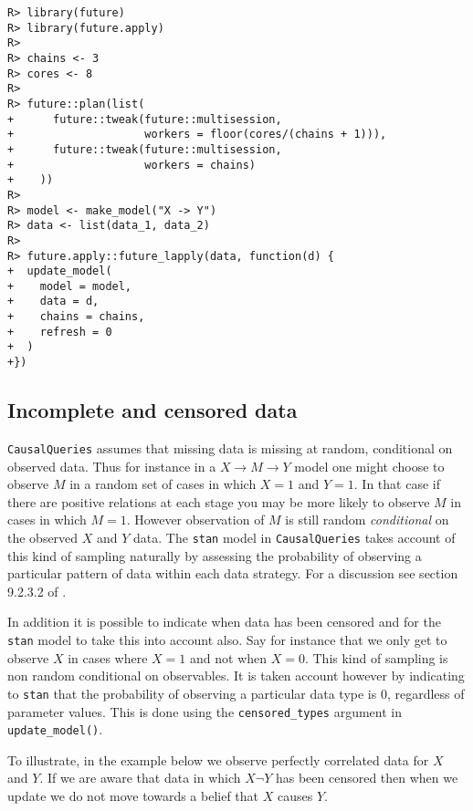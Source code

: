 \documentclass[
  11pt,
  article]{jss}
\begin{document}
\begin{verbatim}
R> library(future)
R> library(future.apply)
R> 
R> chains <- 3
R> cores <- 8
R> 
R> future::plan(list(
+      future::tweak(future::multisession, 
+                    workers = floor(cores/(chains + 1))),
+      future::tweak(future::multisession, 
+                    workers = chains)
+    ))
R> 
R> model <- make_model("X -> Y")
R> data <- list(data_1, data_2)
R> 
R> future.apply::future_lapply(data, function(d) {
+  update_model(
+    model = model,
+    data = d,
+    chains = chains,
+    refresh = 0
+  )
+})
\end{verbatim}

\hypertarget{incomplete-and-censored-data}{%
\subsection{Incomplete and censored
data}\label{incomplete-and-censored-data}}

\texttt{CausalQueries} assumes that missing data is missing at random,
conditional on observed data. Thus for instance in a
\(X \rightarrow M \rightarrow Y\) model one might choose to observe
\(M\) in a random set of cases in which \(X=1\) and \(Y=1\). In that
case if there are positive relations at each stage you may be more
likely to observe \(M\) in cases in which \(M=1\). However observation
of \(M\) is still random \emph{conditional} on the observed \(X\) and
\(Y\) data. The \texttt{stan} model in \texttt{CausalQueries} takes
account of this kind of sampling naturally by assessing the probability
of observing a particular pattern of data within each data strategy. For
a discussion see section 9.2.3.2 of \citet{ii2023}.

In addition it is possible to indicate when data has been censored and
for the \texttt{stan} model to take this into account also. Say for
instance that we only get to observe \(X\) in cases where \(X=1\) and
not when \(X=0\). This kind of sampling is non random conditional on
observables. It is taken account however by indicating to \texttt{stan}
that the probability of observing a particular data type is 0,
regardless of parameter values. This is done using the
\texttt{censored\_types} argument in \texttt{update\_model()}.

To illustrate, in the example below we observe perfectly correlated data
for \(X\) and \(Y\). If we are aware that data in which \(X \neg Y\) has
been censored then when we update we do not move towards a belief that
\(X\) causes \(Y\).
\end{document}

